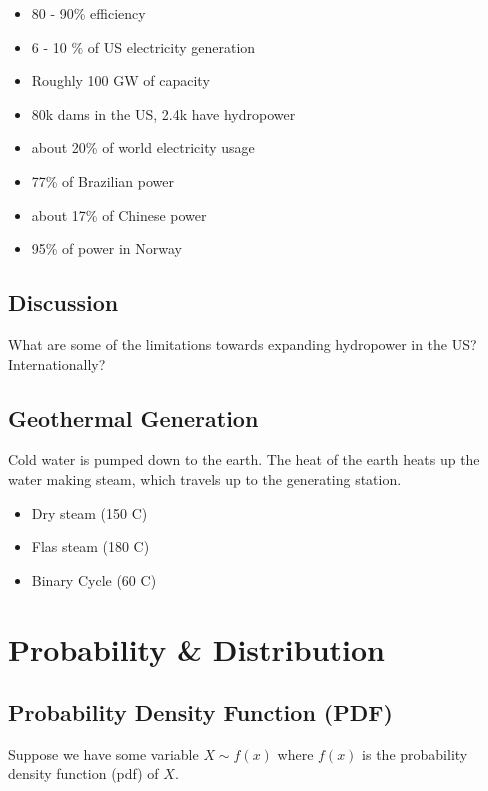 \documentclass[12pt, a4paper]{report}
\begin{document}
  \begin{itemize}
    \item 80 - 90\% efficiency
    \item 6 - 10 \% of US electricity generation
    \item Roughly 100 GW of capacity
    \item 80k dams in the US, 2.4k have hydropower
    \item about 20\% of world electricity usage
    \item 77\% of Brazilian power
    \item about 17\% of Chinese power
    \item 95\% of power in Norway
  \end{itemize}

  \section{Discussion}


  What are some of the limitations towards expanding hydropower in the US? Internationally?

  \section{Geothermal Generation}

  Cold water is pumped down to the earth. The heat of the earth heats up the water making steam, which travels up to the generating station.

  \begin{itemize}
    \item Dry steam (150 C)
    \item Flas steam (180 C)
    \item Binary Cycle (60 C)
  \end{itemize}






  \chapter{Probability \& Distribution}

  \section{Probability Density Function (PDF)}

  Suppose we have some variable $ X \sim f(x) $ where $ f(x) $ is the probability density function (pdf) of $ X. $
\end{document}
